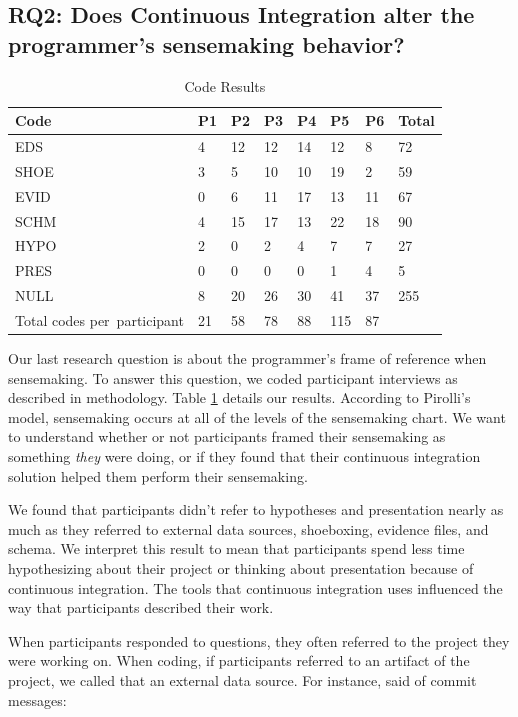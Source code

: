 \documentclass{sig-alternate}
\begin{document}
\subsection{RQ2: Does Continuous Integration alter the programmer's sensemaking behavior?}
\begin{table}
	\centering
	\caption{Code Results}
	\label{table:coderesults}
	\begin{tabular}{ | >{\centering\arraybackslash}p{} | m{0.4cm} | l | l | l | l | l | l | }
		\hline
		\rowcolor{black!20!}Code & P1 & P2 & P3 & P4 & P5 & P6 & Total \\ \hline
		EDS & 4 & 12 & 12 & 14 & 12 & 8 & 72 \\ \hline
		SHOE & 3 & 5 & 10 & 10 & 19 & 2 & 59 \\ \hline
		EVID & 0 & 6 & 11 & 17 & 13 & 11 & 67 \\ \hline
		SCHM & 4 & 15 & 17 & 13 & 22 & 18 & 90 \\ \hline
		HYPO & 2 & 0 & 2 & 4 & 7 & 7 & 27 \\ \hline
		PRES & 0 & 0 & 0 & 0 & 1 & 4 & 5 \\ \hline
		NULL & 8 & 20 & 26 & 30 & 41 & 37 & 255 \\ \hline
		\rowcolor{black!20!}Total codes \mbox{per participant} & 21 & 58 & 78 & 88 & 115 & 87 &  \\ \hline
	\end{tabular}
\end{table}
Our last research question is about the programmer's frame of reference when sensemaking. To answer this question, we coded participant interviews as described in methodology. Table \ref{table:coderesults} details our results.  According to Pirolli's model, sensemaking occurs at all of the levels of the sensemaking chart. We want to understand whether or not participants framed their sensemaking as something \textit{they} were doing, or if they found that their continuous integration solution helped them perform their sensemaking.

We found that participants didn't refer to hypotheses and presentation nearly as much as they referred to external data sources, shoeboxing, evidence files, and schema. We interpret this result to mean that participants spend less time hypothesizing about their project or thinking about presentation because of continuous integration. The tools that continuous integration uses influenced the way that participants described their work.

When participants responded to questions, they often referred to the project they were working on. When coding, if participants referred to an artifact of the project, we called that an external data source. For instance, \srutitwo  said of commit messages: 
\end{document}

